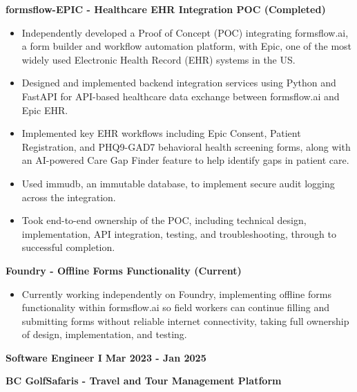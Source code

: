 \documentclass[10pt,a4paper]{article}
\begin{document}
\textbf{formsflow-EPIC - Healthcare EHR Integration POC (Completed)}

\begin{itemize}
    \item Independently developed a Proof of Concept (POC) integrating formsflow.ai, a form builder and workflow automation platform, with Epic, one of the most widely used Electronic Health Record (EHR) systems in the US.
    
    \item Designed and implemented backend integration services using Python and FastAPI for API-based healthcare data exchange between formsflow.ai and Epic EHR.
    
    \item Implemented key EHR workflows including Epic Consent, Patient Registration, and PHQ9-GAD7 behavioral health screening forms, along with an AI-powered Care Gap Finder feature to help identify gaps in patient care.
    
    \item Used immudb, an immutable database, to implement secure audit logging across the integration.
    
    \item Took end-to-end ownership of the POC, including technical design, implementation, API integration, testing, and troubleshooting, through to successful completion.
\end{itemize}

\textbf{Foundry - Offline Forms Functionality (Current)}

\begin{itemize}
    \item Currently working independently on Foundry, implementing offline forms functionality within formsflow.ai so field workers can continue filling and submitting forms without reliable internet connectivity, taking full ownership of design, implementation, and testing.
\end{itemize}


\textbf{Software Engineer I} \hfill \textbf{Mar 2023 - Jan 2025}

\textbf{BC GolfSafaris - Travel and Tour Management Platform}
\end{document}
